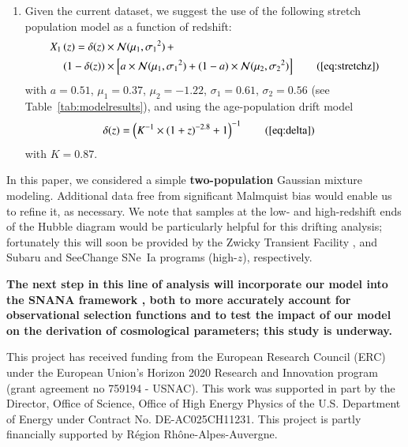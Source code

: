 \documentclass[referee]{aa}
\begin{document}
\begin{enumerate}
    \item Given the current dataset, we suggest the use of the following stretch
        population model as a function of redshift:
        \begin{align*}
        \label{eqconclusion:stretchz}
            X_1\left(z \right) =
            \delta(z)&\times\mathcal{N}(\mu_1,\sigma_1{}^2)\,+\nonumber\\
            (1-\delta(z))&\times \left[a\times\mathcal{N}(\mu_1,\sigma_1{}^2) +
            (1-a)\times\mathcal{N}(\mu_2,\sigma_2{}^2)\right]
            \tag{\ref{eq:stretchz}}
        \end{align*}
        with $a=0.51$, $\mu_1=0.37$, $\mu_2=-1.22$, $\sigma_1=0.61$,
        $\sigma_2=0.56$ (see Table~\ref{tab:modelresults}), and using the
        age-population drift model \begin{align*}
            \delta(z) & = \left( K^{-1} \times (1+z)^{-2.8} +1 \right)^{-1}
            \tag{\ref{eq:delta}}
        \end{align*}
        with $K=0.87$.
\end{enumerate}

In this paper, we considered a simple \textbf{two-population} Gaussian mixture
modeling. Additional data free from significant Malmquist bias would enable
us to refine it, as necessary. We note that samples at the low- and high-redshift
ends of the Hubble diagram would be particularly helpful for this drifting
analysis; fortunately this will soon be provided by the Zwicky Transient
Facility \citep[low-$z$,][]{bellm2019, graham2019}, and Subaru and SeeChange
SNe~Ia programs (high-$z$), respectively. 

\textbf{The next step in this line of analysis will incorporate our model into
the SNANA framework \citep{SNANA}, both to more accurately account for
observational selection functions and to test the impact of our model on the
derivation of cosmological parameters; this study is underway.}

\begin{acknowledgements}
    This project has received funding from the European Research Council (ERC)
    under the European Union's Horizon 2020 Research and Innovation program
    (grant agreement no 759194 - USNAC).
    This work was supported in part by the Director, Office of Science, Office
    of High Energy Physics of the U.S. Department of Energy under Contract No.
    DE-AC025CH11231.
    This project is partly financially supported by Région Rhône-Alpes-Auvergne.
\end{acknowledgements}
\end{document}
